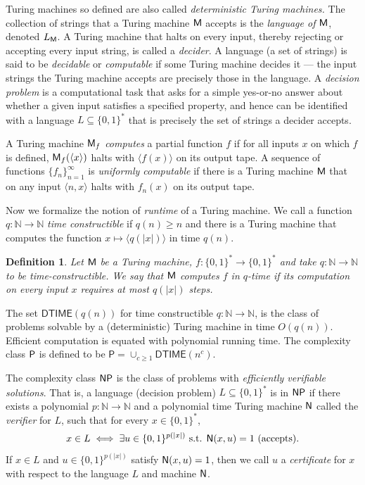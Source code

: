 \documentclass{amsart}
\theoremstyle{theorem}
\newtheorem{definition}[theorem]{Definition}
\theoremstyle{remark}
\numberwithin{equation}{section}
\newcommand{\NN}{\mathbb{N}}
\newcommand{\ccP}{\textsf{\upshape P}}
\newcommand{\ccNP}{\textsf{\upshape NP}}
\newcommand{\ccM}{\textsf{\upshape M}}
\newcommand{\ccN}{\textsf{\upshape N}}
\begin{document}
Turing machines so defined are also called \emph{deterministic Turing machines.}
The collection of strings that a Turing machine $\ccM$ accepts is the \emph{language of $\ccM$}, denoted $L_\ccM$. A Turing machine that halts on every input, thereby rejecting or accepting every input string, is called a \emph{decider}. A language (a set of strings) is said to be \emph{decidable} or \emph{computable} if some Turing machine decides it --- the input strings the Turing machine accepts are precisely those in the language. A \emph{decision problem} is a computational task that asks for a simple yes-or-no answer about whether a given input satisfies a specified property, and hence can be identified with a language $L \subseteq \{0,1\}^*$ that is precisely the set of strings a decider accepts.

A Turing machine $\ccM_f$ \emph{computes} a partial function $f$ if for all inputs $x$ on which $f$ is defined, $\ccM_f(\langle x\rangle)$ halts with $\langle f(x)\rangle$ on its output tape. A sequence of functions $\{f_n\}_{n=1}^\infty$ is \emph{uniformly computable} if there is a Turing machine $\ccM$ that on any input $\langle n, x\rangle$ halts with $f_n(x)$ on its output tape.

Now we formalize the notion of \emph{runtime} of a Turing machine. We call a function $q:\NN\rightarrow \NN$ \emph{time constructible} if $q(n) \geq n$ and there is a Turing machine that computes the function $x\mapsto \langle q(|x|)\rangle$ in time $q(n)$.

\begin{definition}
Let $\ccM$ be a Turing machine, $f:\{0, 1\}^* \rightarrow \{0, 1\}^*$ and take $q:\NN \rightarrow \NN$ to be  time-constructible. We say that $\ccM$ \emph{computes $f$ in $q$-time} if its computation on every input $x$ requires at most $q(|x|)$ steps.
\end{definition}

The set $\textsf{DTIME}(q(n))$ for time constructible $q:\mathbb{N}\rightarrow \mathbb{N}$, is the class of problems solvable by a (deterministic) Turing machine in time $O(q(n))$.
Efficient computation is equated with polynomial running time. The complexity class $\ccP$ is defined to be $\textsf{P} = \cup_{c \geq 1} \textsf{DTIME}(n^c)$.

The complexity class $\ccNP$ is the class of problems with \textit{efficiently verifiable solutions}. 
That is, a language (decision problem) $L \subseteq \{0, 1\}^*$ is in $\ccNP$ if there exists a polynomial $p:\NN\rightarrow \NN$ and a polynomial time Turing machine $\ccN$ called the \emph{verifier} for $L$, such that for every $x \in \{0, 1\}^*$, 
\[
x \in L \iff \exists u \in \{0, 1\}^{p(|x|)} \text{ s.t. } \ccN(x, u) = 1 \text{ (accepts).}
\]
If $x \in L$ and $u \in \{0, 1\}^{p(|x|)}$ satisfy $\ccN(x, u) = 1$, then we call $u$ a \emph{certificate} for $x$ with respect to the language $L$ and machine $\ccN$.
\end{document}

